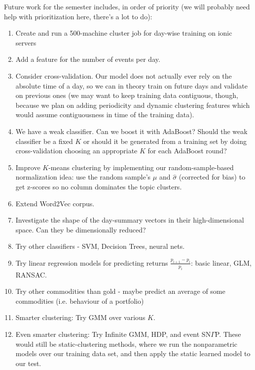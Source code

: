 Future work for the semester includes, in order of priority (we will probably need help with prioritization here, there's a lot to do):
\begin{enumerate}
\item Create and run a 500-machine cluster job for day-wise training on ionic servers
\item Add a feature for the number of events per day.
\item Consider cross-validation. Our model does not actually ever rely on the absolute time of a day, so we can in theory train on future days and validate on previous ones (we may want to keep training data contiguous, though, because we plan on adding periodicity and dynamic clustering features which would assume contiguousness in time of the training data).
\item We have a weak classifier. Can we boost it with AdaBoost? Should the weak classifier be a fixed $K$ or should it be generated from a training set by doing cross-validation choosing an appropriate $K$ for each AdaBoost round?
\item Improve $K$-means clustering by implementing our random-sample-based normalization idea: use the random sample's $\hat{\mu}$ and $\hat{\sigma}$ (corrected for bias) to get z-scores so no column dominates the topic clusters.
\item Extend Word2Vec corpus.
\item Investigate the shape of the day-summary vectors in their high-dimensional space. Can they be dimensionally reduced?
\item Try other classifiers - SVM, Decision Trees, neural nets.
\item Try linear regression models for predicting returns $\frac{p_{i+1}-p_i}{p_i}$: basic linear, GLM, RANSAC.
\item Try other commodities than gold - maybe predict an average of some commodities (i.e. behaviour of a portfolio)
\item Smarter clustering: Try GMM over various $K$.
\item Even smarter clustering: Try Infinite GMM, HDP, and event SN$\Gamma$P. These would still be static-clustering methods, where we run the nonparametric models over our training data set, and then apply the static learned model to our test.
\end{enumerate}

